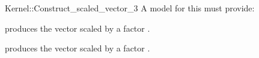 \begin{ccRefFunctionObjectConcept}{Kernel::Construct_scaled_vector_3}
A model for this must provide:



            {produces the vector  scaled by a factor .}

            {produces the vector  scaled by a factor .}


\end{ccRefFunctionObjectConcept}
